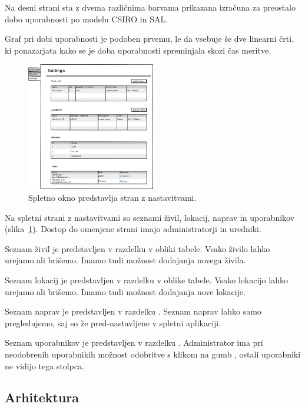 \documentclass[a4paper, 12pt]{book}
\begin{document}
Na desni strani sta z dvema različnima barvama prikazana izračuna za preostalo dobo uporabnosti po modelu CSIRO in SAL.

Graf pri dobi uporabnosti je podoben prvemu, le da vsebuje še dve linearni črti, ki ponazarjata kako se je doba uporabnosti spreminjala skozi čas meritve.

\vspace{5mm}

\begin{figure}[h]
\begin{center}
\includegraphics[width=0.5\textwidth]{slike/Settings.png}
\end{center}
\caption{Spletno okno predstavlja stran z nastavitvami.}
\label{settings-wireframe}
\end{figure}

Na spletni strani z nastavitvami so seznami živil, lokacij, naprav in uporabnikov (slika~\ref{settings-wireframe}). Dostop do omenjene strani imajo administratorji in uredniki. 

Seznam živil je predstavljen v razdelku  v obliki tabele. Vsako živilo lahko urejamo ali brišemo. Imamo tudi možnost dodajanja novega živila. 

Seznam lokacij je predstavljen v razdelku  v oblike tabele. Vsako lokacijo lahko urejamo ali brišemo. Imamo tudi možnost dodajanja nove lokacije.

Seznam naprav je predstavljen v razdelku . Seznam naprav lahko samo pregledujemo, saj so že pred-nastavljene v spletni aplikaciji.

Seznam uporabnikov je predstavljen v razdelku . 
Administrator ima pri neodobrenih uporabnikih možnost odobritve s klikom na gumb , ostali uporabniki ne vidijo tega stolpca. 



\subsection{Arhitektura}
\end{document}

